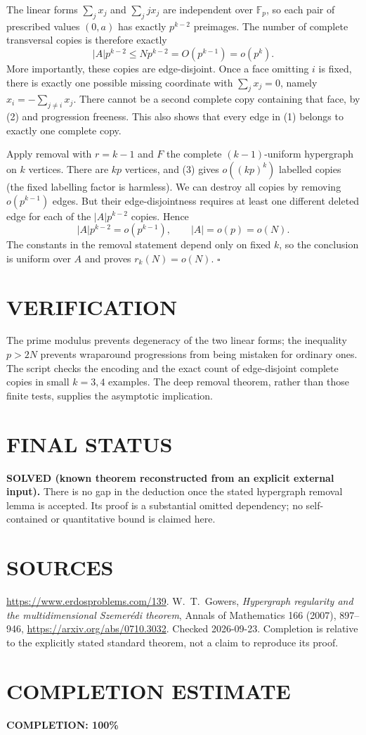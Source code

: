 The linear forms $\sum_jx_j$ and $\sum_jjx_j$ are independent over
$\mathbb F_p$, so each pair of prescribed values $(0,a)$ has exactly
$p^{k-2}$ preimages. The number of complete transversal copies is
therefore exactly
\[
 |A|p^{k-2}\le Np^{k-2}=O(p^{k-1})=o(p^k).              \tag{3}
\]
More importantly, these copies are edge-disjoint. Once a face omitting
$i$ is fixed, there is exactly one possible missing coordinate with
$\sum_jx_j=0$, namely $x_i=-\sum_{j\ne i}x_j$. There cannot be a
second complete copy containing that face, by (2) and progression
freeness. This also shows that every edge in (1) belongs to exactly
one complete copy.

Apply removal with $r=k-1$ and $F$ the complete $(k-1)$-uniform
hypergraph on $k$ vertices. There are $kp$ vertices, and (3) gives
$o((kp)^k)$ labelled copies (the fixed labelling factor is harmless).
We can destroy all copies by removing $o(p^{k-1})$ edges. But their
edge-disjointness requires at least one different deleted edge for
each of the $|A|p^{k-2}$ copies. Hence
\[
 |A|p^{k-2}=o(p^{k-1}),\qquad |A|=o(p)=o(N).
\]
The constants in the removal statement depend only on fixed $k$, so
the conclusion is uniform over $A$ and proves $r_k(N)=o(N)$.
\hfill$\square$

\section{VERIFICATION}
The prime modulus prevents degeneracy of the two linear forms; the
inequality $p>2N$ prevents wraparound progressions from being mistaken
for ordinary ones. The script checks the encoding and the exact count
of edge-disjoint complete copies in small $k=3,4$ examples. The deep
removal theorem, rather than those finite tests, supplies the
asymptotic implication.

\section{FINAL STATUS}
\textbf{SOLVED (known theorem reconstructed from an explicit external input).}
There is no gap in the deduction once the stated hypergraph removal
lemma is accepted. Its proof is a substantial omitted dependency;
no self-contained or quantitative bound is claimed here.

\section{SOURCES}
\url{https://www.erdosproblems.com/139}.
W.~T.~Gowers, \emph{Hypergraph regularity and the multidimensional
Szemer\'edi theorem}, Annals of Mathematics 166 (2007), 897--946,
\url{https://arxiv.org/abs/0710.3032}.
Checked 2026-09-23. Completion is relative to the explicitly stated
standard theorem, not a claim to reproduce its proof.

\section{COMPLETION ESTIMATE}
\textbf{COMPLETION: 100\%}
